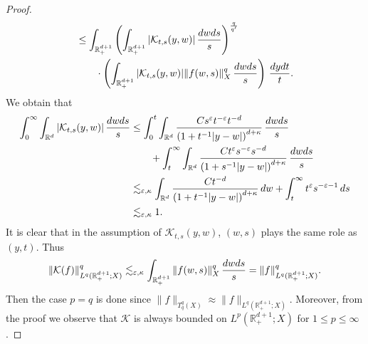 \documentclass[oneside,english,a4wide]{amsart}
\numberwithin{equation}{section}
\numberwithin{figure}{section}
\theoremstyle{plain}
\theoremstyle{plain}
\theoremstyle{definition}
\theoremstyle{plain}
\theoremstyle{remark}
\theoremstyle{definition}
\theoremstyle{remark}
\theoremstyle{definition}
\newcommand{\real}{{\mathbb R}}
\newcommand{\e}{\varepsilon}
\newcommand{\8}{+\infty}
\renewcommand{\1}{\mathbbm{1}}
\newcommand{\K}{{\mathcal K}}
\newcommand\sk[1]{ \left( #1 \right) }
\renewcommand\d{{\rm d}}
\begin{document}
{\begin{proof}
\[\begin{aligned}
    & \leq \int_{\real^{d+1}_+} \sk{ \int_{\real^{d+1}_+} |\K_{t, s}(y, w)|\, \frac{\d w \d s}{s} }^{\frac{q}{q'}}\\
    &\qquad \cdot\sk{ \int_{\real^{d+1}_+} |\K_{t, s}(y, w)|\|f(w, s)\|_X^q \,\frac{\d w\d s}{s}} \, \frac{\d y \d t}{t}.
\end{aligned}       
\]
We obtain that
\[
\begin{aligned}
    \int_0^{\infty}\int_{\real^d} |\K_{t, s}(y, w)|\, \frac{\d w \d s}{s} & \leq  \int_0^t\int_{\real^d} \frac{ Cs^{\e}t^{-\e} t^{-d} }{\sk{ 1 + t^{-1}|y - w| }^{d + \kappa}  } \,\frac{\d w\d s}{s} \\
    & \qquad + \int_t^{\infty}\int_{\real^d} \frac{ Ct^{\e}s^{-\e} s^{-d} }{\sk{ 1 + s^{-1}|y - w| }^{d + \kappa}  } \,\frac{\d w\d s}{s}\\
    & \lesssim_{\e, \kappa} \int_{\real^d} \frac{ C t^{-d} }{\sk{ 1 + t^{-1}|y - w| }^{d + \kappa}  } \,\d w + \int_t^{\infty} t^{\e}s^{-\e-1} \,\d s \\
    & \lesssim_{\e, \kappa} 1.
\end{aligned}
\]
It is clear that in the assumption of $\K_{t, s}(y, w)$, $(w, s)$ plays the same role as $(y, t)$. Thus
\begin{equation}\label{eTqtoq}
    \|  \K(f) \|_{L^q(\real^{d+1}_+; X)}^q \lesssim_{\e, \kappa} \int_{\real^{d+1}_+} \|f(w, s)\|_X^q \, \frac{\d w \d s}{s} = \| f \|_{L^{q}(\real^{d+1}_+; X)}^q.
\end{equation}
Then the case $p = q$ is done since $\| f \|_{T^q_q(X)} \approx {\| f \|_{L^q(\real^{d+1}_+; X)} }$. Moreover, from the proof we observe that $\K$ is always bounded on $L^p(\real^{d+1}_+; X)$ for $1 \leq p \leq \infty$. 


\end{proof}}
\end{document}
